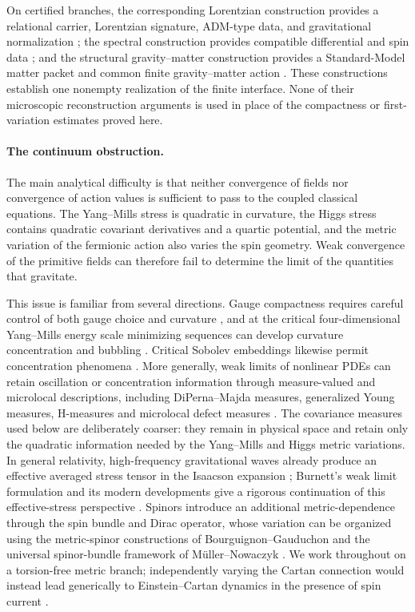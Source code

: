 \documentclass[11pt]{article}
\numberwithin{equation}{section}
\theoremstyle{definition}
\theoremstyle{remark}
\begin{document}
On certified branches, the corresponding Lorentzian construction provides a
relational carrier, Lorentzian signature, ADM-type data, and gravitational
normalization \cite{PelissierRenewalSpacetime2026}; the spectral construction
provides compatible differential and spin data
\cite{PelissierSpectral2026}; and the structural gravity--matter construction
provides a Standard-Model matter packet and common finite gravity--matter
action \cite{PelissierDuality2026}.  These constructions establish one
nonempty realization of the finite interface.  None of their microscopic
reconstruction arguments is used in place of the compactness or
first-variation estimates proved here.

\paragraph{The continuum obstruction.}

The main analytical difficulty is that neither convergence of fields nor
convergence of action values is sufficient to pass to the coupled classical
equations.  The Yang--Mills stress is quadratic in curvature, the Higgs stress
contains quadratic covariant derivatives and a quartic potential, and the
metric variation of the fermionic action also varies the spin geometry.
Weak convergence of the primitive fields can therefore fail to determine the
limit of the quantities that gravitate.

This issue is familiar from several directions.  Gauge compactness requires
careful control of both gauge choice and curvature \cite{Uhlenbeck1982}, and
at the critical four-dimensional Yang--Mills energy scale minimizing
sequences can develop curvature concentration and bubbling
\cite{Sedlacek1982}.  Critical Sobolev embeddings likewise permit
concentration phenomena \cite{Lions1985}.  More generally, weak limits of
nonlinear PDEs can retain oscillation or concentration information through
measure-valued and microlocal descriptions, including DiPerna--Majda
measures, generalized Young measures, H-measures and microlocal defect
measures \cite{DiPernaMajda1987,AlibertBouchitte1997,Tartar1990,Gerard1991}.
The covariance measures used below are deliberately coarser: they remain in
physical space and retain only the quadratic information needed by the
Yang--Mills and Higgs metric variations.  In general relativity,
high-frequency gravitational waves already produce an effective averaged
stress tensor in the Isaacson expansion \cite{Isaacson1968}; Burnett's weak
limit formulation and its modern developments give a rigorous continuation
of this effective-stress perspective \cite{Burnett1989,HuneauLuk2024}.
Spinors introduce an additional metric-dependence through the spin bundle and
Dirac operator, whose variation can be organized using the metric-spinor
constructions of Bourguignon--Gauduchon \cite{BourguignonGauduchon1992} and
the universal spinor-bundle framework of M\"uller--Nowaczyk
\cite{MullerNowaczyk2017}.  We work throughout on a torsion-free metric
branch; independently varying the Cartan connection would instead lead
generically to Einstein--Cartan dynamics in the presence of spin current
\cite{Kibble1961,HehlEtAl1976}.
\end{document}
